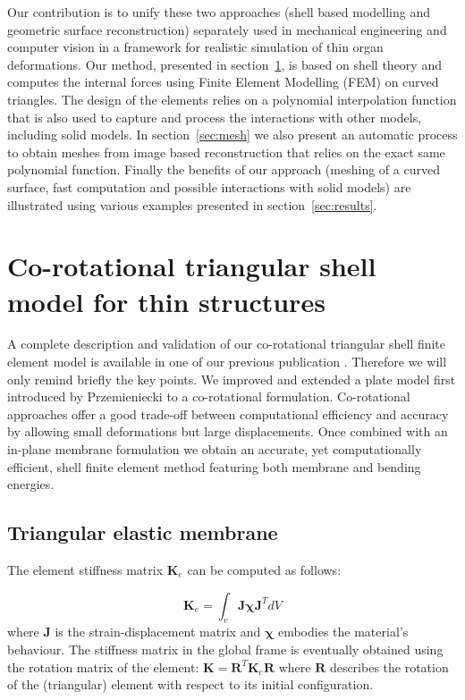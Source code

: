 \documentclass{llncs}
\begin{document}
Our contribution is to unify these two approaches (shell based modelling and geometric surface reconstruction) separately used in mechanical engineering and computer vision in a framework for realistic simulation of thin organ deformations. Our method, presented in section~\ref{sec:model}, is based on shell theory and computes the internal forces using Finite Element Modelling (FEM) on curved triangles. The design of the elements relies on a polynomial interpolation function that is also used to capture and process the interactions with other models, including solid models. In section~\ref{sec:mesh} we also present an automatic process to obtain meshes from image based reconstruction that relies on the exact same polynomial function.
Finally the benefits of our approach (meshing of a curved surface, fast computation and possible interactions with solid models) are illustrated using various examples presented in section~\ref{sec:results}.

\section{Co-rotational triangular shell model for thin structures}
\label{sec:model}

A complete description and validation of our co-rotational triangular shell finite element model is available in one of our previous publication \cite{Comas2010ISBMS}. Therefore we will only remind briefly the key points. We improved and extended a plate model first introduced by Przemieniecki \cite{Przemieniecki68} to a co-rotational formulation. Co-rotational approaches offer a good trade-off between computational efficiency and accuracy by allowing small deformations but large displacements. Once combined with an in-plane membrane formulation we obtain an accurate, yet computationally efficient, shell finite element method featuring both membrane and bending energies. 

\subsection{Triangular elastic membrane}

The element stiffness matrix $\textbf{K}_e$ can be computed as follows:

\begin{equation}
\textbf{K}_e = \int_v \textbf{J} \boldsymbol{\chi} \textbf{J}^{T} dV
\end{equation}
where $\textbf{J}$ is the strain-displacement matrix and $\boldsymbol\chi$ embodies the material's behaviour. The stiffness matrix in the global frame is eventually obtained using the rotation matrix of the element: $\textbf{K} = \textbf{R}^{T} \textbf{K}_e \textbf{R} $ where $\textbf{R}$ describes the rotation of the (triangular) element with respect to its initial configuration.
\end{document}
